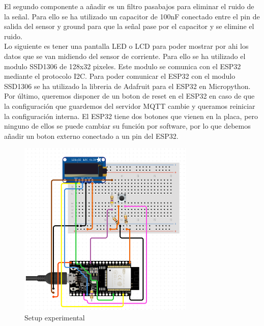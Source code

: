 \begin{titlepage}
El segundo componente a añadir es un filtro pasabajos para eliminar el ruido de la señal. Para ello se ha utilizado un capacitor de 100nF conectado entre el pin de salida del sensor y ground para que la señal pase por el capacitor y se elimine el ruido.\\

Lo siguiente es tener una pantalla LED o LCD para poder mostrar por ahi los datos que se van midiendo del sensor de corriente. Para ello se ha utilizado el modulo SSD1306 de 128x32 pixeles. Este modulo se comunica con el ESP32 mediante el protocolo I2C. Para poder comunicar el ESP32 con el modulo SSD1306 se ha utilizado la libreria de Adafruit para el ESP32 en Micropython.\\

Por último, queremos disponer de un boton de reset en el ESP32 en caso de que la configuración que guardemos del servidor MQTT cambie y queramos reiniciar la configuración interna. El ESP32 tiene dos botones que vienen en la placa, pero ninguno de ellos se puede cambiar su función por software, por lo que debemos añadir un boton externo conectado a un pin del ESP32. \\

\begin{figure}[h!]
	\centering
	\includegraphics[width=0.75\textwidth]{imagenes/setup.png}
	\caption{Setup experimental}
\end{figure}

\end{titlepage}
